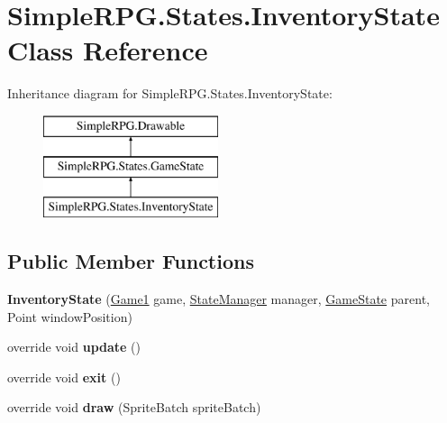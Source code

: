 \hypertarget{class_simple_r_p_g_1_1_states_1_1_inventory_state}{\section{Simple\+R\+P\+G.\+States.\+Inventory\+State Class Reference}
\label{class_simple_r_p_g_1_1_states_1_1_inventory_state}
}
Inheritance diagram for Simple\+R\+P\+G.\+States.\+Inventory\+State\+:\begin{figure}[H]
\begin{center}
\leavevmode
\includegraphics[height=3.000000cm]{class_simple_r_p_g_1_1_states_1_1_inventory_state}
\end{center}
\end{figure}
\subsection*{Public Member Functions}
\begin{DoxyCompactItemize}
\item 
\hypertarget{class_simple_r_p_g_1_1_states_1_1_inventory_state_aeed5770ba4e1f6d9a4c132d2fb1b71f1}{{\bfseries Inventory\+State} (\hyperlink{class_simple_r_p_g_1_1_game1}{Game1} game, \hyperlink{class_simple_r_p_g_1_1_states_1_1_state_manager}{State\+Manager} manager, \hyperlink{class_simple_r_p_g_1_1_states_1_1_game_state}{Game\+State} parent, Point window\+Position)}\label{class_simple_r_p_g_1_1_states_1_1_inventory_state_aeed5770ba4e1f6d9a4c132d2fb1b71f1}

\item 
\hypertarget{class_simple_r_p_g_1_1_states_1_1_inventory_state_a87827673a8facbdc18bbe4de68eb250b}{override void {\bfseries update} ()}\label{class_simple_r_p_g_1_1_states_1_1_inventory_state_a87827673a8facbdc18bbe4de68eb250b}

\item 
\hypertarget{class_simple_r_p_g_1_1_states_1_1_inventory_state_a1632dd2d7dba038d8416130ef4e7e643}{override void {\bfseries exit} ()}\label{class_simple_r_p_g_1_1_states_1_1_inventory_state_a1632dd2d7dba038d8416130ef4e7e643}

\item 
\hypertarget{class_simple_r_p_g_1_1_states_1_1_inventory_state_a1a7b78358df3cc6c9e21084195f1c99e}{override void {\bfseries draw} (Sprite\+Batch sprite\+Batch)}\label{class_simple_r_p_g_1_1_states_1_1_inventory_state_a1a7b78358df3cc6c9e21084195f1c99e}

\end{DoxyCompactItemize}
